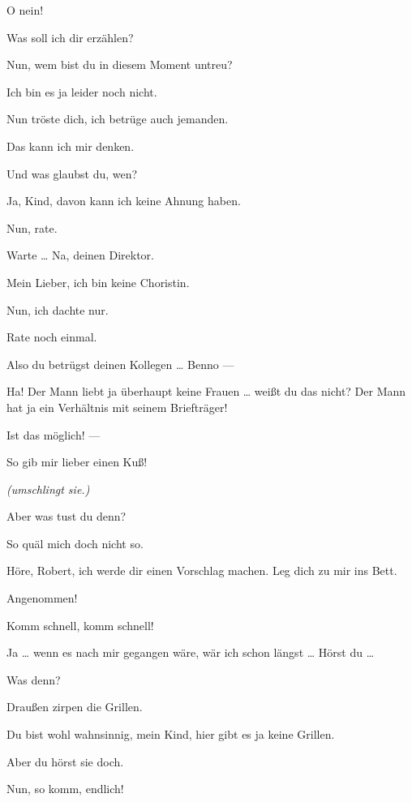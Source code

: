 \documentclass[
	final,
	a4paper,
	ngerman,
	mpinclude = true, %
	twoside = true,
	open = right,
	cleardoublepage = plain,
	DIV = 13,
	BCOR = 1cm,
	titlepage = firstiscover,
	]{scrbook}
\newcommand{\direction}[1]{\textit{(#1)}}
\newcommand{\thecharacter}[1]{\textup{\textsc{#1}}\xspace}
\newcommand{\thedichter}{\thecharacter{Dichter}}
\newcommand{\theschauspielerin}{\thecharacter{Schauspielerin}}
\newcommand{\character}[1]{\item[#1:]}
\newcommand{\dichter}{\character{\thedichter}}
\newcommand{\schauspielerin}{\character{\theschauspielerin}}
\begin{document}
\begin{play}
	\schauspielerin
	O nein!

	\dichter
	Was soll ich dir erzählen?

	\schauspielerin
	Nun, wem bist du in diesem Moment untreu?

	\dichter
	Ich bin es ja leider noch nicht.

	\schauspielerin
	Nun tröste dich, ich betrüge auch jemanden.

	\dichter
	Das kann ich mir denken.

	\schauspielerin
	Und was glaubst du, wen?

	\dichter
	Ja, Kind, davon kann ich keine Ahnung haben.

	\schauspielerin
	Nun, rate.

	\dichter
	Warte \ldots{} Na, deinen Direktor.

	\schauspielerin
	Mein Lieber, ich bin keine Choristin.

	\dichter
	Nun, ich dachte nur.

	\schauspielerin
	Rate noch einmal.

	\dichter
	Also du betrügst deinen Kollegen \ldots{} Benno ---

	\schauspielerin
	Ha! Der Mann liebt ja überhaupt keine Frauen \ldots{} weißt du das nicht? Der Mann hat ja ein Verhältnis mit seinem Briefträger!

	\dichter
	Ist das möglich! ---

	\schauspielerin
	So gib mir lieber einen Kuß!

	\dichter
	\direction{umschlingt sie.}

	\schauspielerin
	Aber was tust du denn?

	\dichter
	So quäl mich doch nicht so.

	\schauspielerin
	Höre, Robert, ich werde dir einen Vorschlag machen. Leg dich zu mir ins Bett.

	\dichter
	Angenommen!

	\schauspielerin
	Komm schnell, komm schnell!

	\dichter
	Ja \ldots{} wenn es nach mir gegangen wäre, wär ich schon längst \ldots{} Hörst du \ldots{}

	\schauspielerin
	Was denn?

	\dichter
	Draußen zirpen die Grillen.

	\schauspielerin
	Du bist wohl wahnsinnig, mein Kind, hier gibt es ja keine Grillen.

	\dichter
	Aber du hörst sie doch.

	\schauspielerin
	Nun, so komm, endlich!


\end{play}
\end{document}

